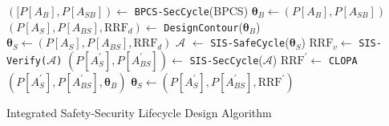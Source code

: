 \documentclass[journal]{IEEEtran}
\begin{document}
\begin{algorithm}[]
$([P[A_B], P[A_{SB}]) \leftarrow$ \texttt{BPCS-SecCycle}(BPCS) \;
$\bm{\theta}_B \leftarrow (P[A_B], P[A_{SB}])$ \;
$\left(P[A_S], P[A_{BS}], \text{RRF}_d \right) \leftarrow$ \texttt{DesignContour}($\bm{\theta}_B$) \;
$\bm{\theta}_S \leftarrow \left(P[A_S], P[A_{BS}], \text{RRF}_d \right)$ \;
{
    $\mathcal{A}$ $\leftarrow$ \texttt{SIS-SafeCycle}($\bm{\theta}_S$) \;
    $\text{RRF}_v \leftarrow$ \texttt{SIS-Verify($\mathcal{A}$)} \;
    $(P[A^\prime_S], P[A^\prime_{BS}]) \leftarrow$ \texttt{SIS-SecCycle}($\mathcal{A}$) \;
    $\text{RRF}^\prime \leftarrow$ \texttt{CLOPA}$\left(P[A^\prime_S], P[A^\prime_{BS}] , \bm{\theta}_B \right)$ \;
    $\bm{\theta}_S \leftarrow \left(P[A^\prime_S], P[A^\prime_{BS}], \text{RRF}^\prime \right)$ \;
}
 \;
\caption{Integrated Safety-Security Lifecycle Design Algorithm}
\label{alg:DesignProcess}
\end{algorithm}
\end{document}
